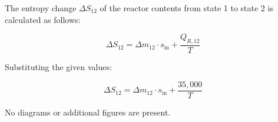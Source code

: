 The entropy change \( \Delta S_{12} \) of the reactor contents from state 1 to state 2 is calculated as follows:  

\[
\Delta S_{12} = \Delta m_{12} \cdot s_{\text{in}} + \frac{Q_{R,12}}{T}
\]

Substituting the given values:  

\[
\Delta S_{12} = \Delta m_{12} \cdot s_{\text{in}} + \frac{35{,}000}{T}
\]  

No diagrams or additional figures are present.